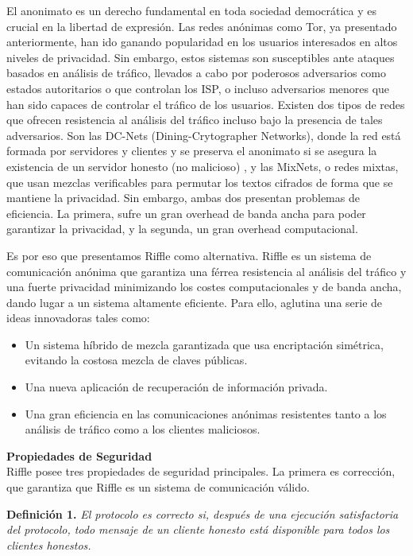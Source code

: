 El anonimato es un derecho fundamental en toda sociedad democrática y es crucial en la libertad de expresión. Las redes anónimas como Tor, ya presentado anteriormente, han ido ganando popularidad en los usuarios interesados en altos niveles de privacidad. Sin embargo, estos sistemas son susceptibles ante ataques basados en análisis de tráfico, llevados a cabo por poderosos adversarios como estados autoritarios o que controlan los ISP, o incluso adversarios menores que han sido capaces de controlar el tráfico de los usuarios.
Existen dos tipos de redes que ofrecen resistencia al análisis del tráfico incluso bajo la presencia de tales adversarios. Son las DC-Nets (Dining-Crytographer Networks), donde la red está formada por servidores y clientes y se preserva el anonimato si se asegura la existencia de un servidor honesto (no malicioso) , y las MixNets, o redes mixtas, que usan mezclas verificables para permutar los textos cifrados de forma que se mantiene la privacidad. Sin embargo, ambas dos presentan problemas de eficiencia. La primera, sufre un gran overhead de banda ancha para poder garantizar la privacidad, y la segunda, un gran overhead computacional. 

Es por eso que presentamos Riffle como alternativa. Riffle es un sistema de comunicación anónima que garantiza una férrea resistencia al análisis del tráfico y una fuerte privacidad minimizando los costes computacionales y de banda ancha, dando lugar a un sistema altamente eficiente. Para ello, aglutina una serie de ideas innovadoras tales como:

\begin{itemize}
	\item Un sistema híbrido de mezcla garantizada que usa encriptación simétrica, evitando la costosa mezcla de claves públicas.
	\item Una nueva aplicación de recuperación de información privada.
	\item Una gran eficiencia en las comunicaciones anónimas resistentes tanto a los análisis de tráfico como a los clientes maliciosos.
\end{itemize}

\textbf{\large{Propiedades de Seguridad}} \\ 

Riffle posee tres propiedades de seguridad principales. La primera es corrección, que garantiza que Riffle es un sistema de comunicación válido.

\textbf{Definición 1.} \textit{El protocolo es correcto si, después de una ejecución satisfactoria del protocolo, todo mensaje de un cliente honesto está disponible para todos los clientes honestos.} \\

